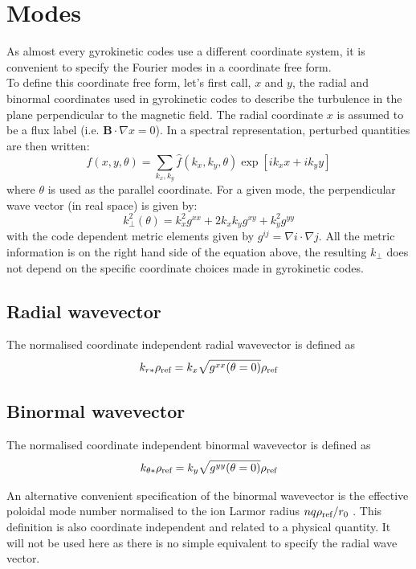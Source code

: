 \documentclass[fleqn]{report}
\begin{document}
\section{Modes}
As almost every gyrokinetic codes use a different coordinate system, it is convenient to specify the Fourier modes in a coordinate free form.\\
To define this coordinate free form, let's first call, $x$ and $y$, the radial and binormal coordinates used in gyrokinetic codes to describe the turbulence in the plane perpendicular to the magnetic field. The radial coordinate $x$ is assumed to be a flux label (i.e. $\mathbf{B}\cdot \nabla x =0$).
In a spectral representation, perturbed quantities are then written:
\begin{equation}
 f(x,y,\theta) = \sum_{k_x,k_y} \hat{f}(k_x,k_y,\theta)\exp[ik_x x + ik_y y] 
\end{equation}
where $\theta$ is used as the parallel coordinate.
For a given mode, the perpendicular wave vector (in real space) is given by:
\begin{equation}
 k_\perp^2(\theta) = k_x^2 g^{xx} + 2k_xk_y g^{xy} + k_y^2g^{yy}
\end{equation}
with the code dependent metric elements given by $g^{ij}=\nabla i \cdot \nabla j$. All the metric information is on the right hand side of the equation above, the resulting $k_\perp$ does not depend on the specific coordinate choices made in gyrokinetic codes.

\subsection{Radial wavevector}
The normalised coordinate independent radial wavevector is defined as
\begin{equation}
 k_{r*}\rho_{\textrm{ref}} = k_x \sqrt{g^{xx}(\theta=0)} \rho_{\textrm{ref}}
\end{equation}

\subsection{Binormal wavevector}
The normalised coordinate independent binormal wavevector is defined as
\begin{equation}
 k_{\theta*}\rho_{\textrm{ref}} = k_y \sqrt{g^{yy}(\theta=0)} \rho_{\textrm{ref}}
\end{equation}

An alternative convenient specification of the binormal wavevector is the effective poloidal mode number normalised to the ion Larmor radius  $nq\rho_{\textrm{ref}}/r_0$  \cite{Merlo:PoP2016}. This definition is also coordinate independent and related to a physical quantity. It will not be used here as there is no simple equivalent to specify the radial wave vector.
\end{document}

